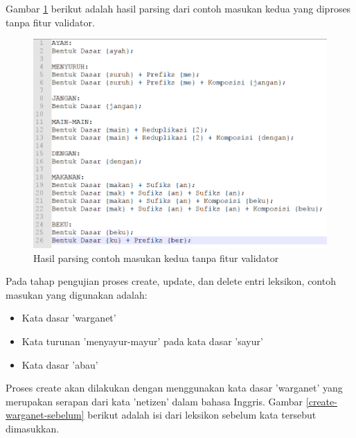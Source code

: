 Gambar \ref{hasil-parsing-tanpa-validator} berikut adalah hasil parsing dari contoh masukan kedua yang diproses tanpa fitur validator.

\begin{figure}[H]
\centering
\includegraphics[scale=0.7]{Gambar/hasil-parsing-tanpa-validator}
\caption{Hasil parsing contoh masukan kedua tanpa fitur validator} 
\label{hasil-parsing-tanpa-validator}
\end{figure}

Pada tahap pengujian proses create, update, dan delete entri leksikon, contoh masukan yang digunakan adalah:

\begin{itemize}
	\item Kata dasar 'warganet'
	\item Kata turunan 'menyayur-mayur' pada kata dasar 'sayur'
	\item Kata dasar 'abau'
\end{itemize}

Proses create akan dilakukan dengan menggunakan kata dasar 'warganet' yang merupakan serapan dari kata 'netizen' dalam bahasa Inggris. Gambar \ref{create-warganet-sebelum} berikut adalah isi dari leksikon sebelum kata tersebut dimasukkan.

